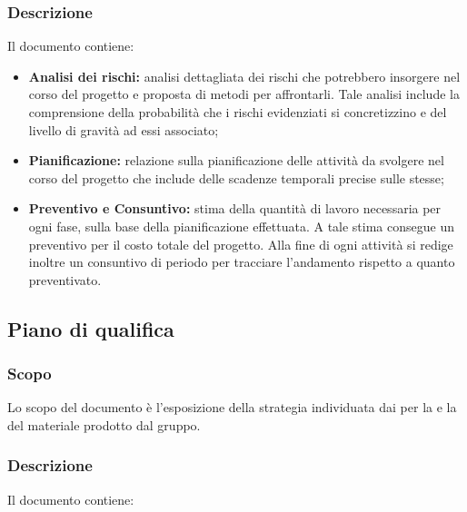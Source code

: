 \documentclass[../NormediProgetto.tex]{subfiles}
\begin{document}
\subsubsection{Descrizione}
Il documento contiene:
\begin{itemize}
    \item \textbf{Analisi dei rischi:} analisi dettagliata dei rischi che potrebbero insorgere nel corso del progetto e proposta di metodi per affrontarli. Tale analisi include la comprensione della probabilità che i rischi evidenziati si concretizzino e del livello di gravità ad essi associato;
    
    \item \textbf{Pianificazione:} relazione sulla pianificazione delle attività da svolgere nel corso del progetto che include delle scadenze temporali precise sulle stesse;
    
    \item \textbf{Preventivo e Consuntivo:} stima della quantità di lavoro necessaria per ogni fase, sulla base della pianificazione effettuata. A tale stima consegue un preventivo per il costo totale del progetto. Alla fine di ogni attività si redige inoltre un consuntivo di periodo per tracciare l’andamento rispetto a quanto preventivato.
\end{itemize}


\subsection{Piano di qualifica}

\subsubsection{Scopo}
Lo scopo del documento è l'esposizione della strategia individuata dai  per la  e la  del materiale prodotto dal gruppo. 

\subsubsection{Descrizione}
Il documento contiene:
\end{document}
